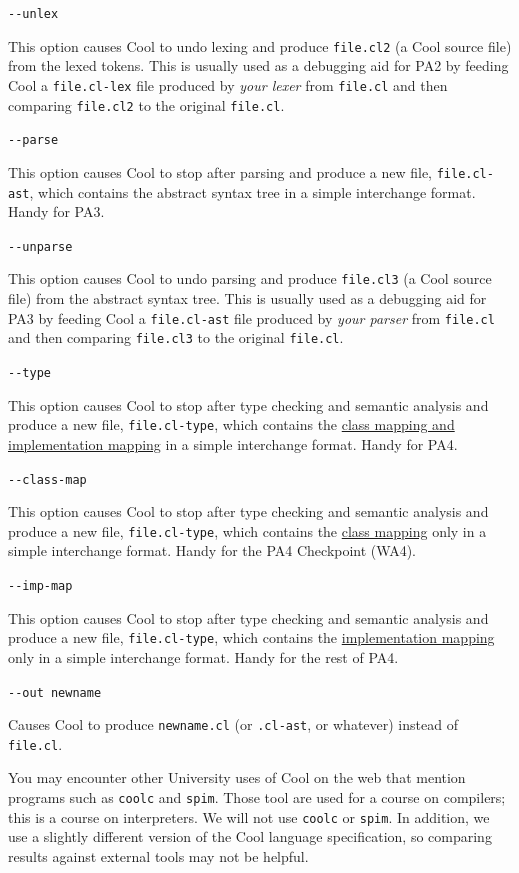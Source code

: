 \documentclass[]{article}
\begin{document}
\texttt{-{}-unlex}

This option causes Cool to undo lexing and produce \texttt{file.cl2} (a
Cool source file) from the lexed tokens. This is usually used as a
debugging aid for PA2 by feeding Cool a \texttt{file.cl-lex} file
produced by \emph{your lexer} from \texttt{file.cl} and then comparing
\texttt{file.cl2} to the original \texttt{file.cl}.

\texttt{-{}-parse}

This option causes Cool to stop after parsing and produce a new file,
\texttt{file.cl-ast}, which contains the abstract syntax tree in a
simple interchange format. Handy for PA3.

\texttt{-{}-unparse}

This option causes Cool to undo parsing and produce \texttt{file.cl3} (a
Cool source file) from the abstract syntax tree. This is usually used as
a debugging aid for PA3 by feeding Cool a \texttt{file.cl-ast} file
produced by \emph{your parser} from \texttt{file.cl} and then comparing
\texttt{file.cl3} to the original \texttt{file.cl}.

\texttt{-{}-type}

This option causes Cool to stop after type checking and semantic
analysis and produce a new file, \texttt{file.cl-type}, which contains
the \href{node47.html}{class mapping and implementation mapping} in a
simple interchange format. Handy for PA4.

\texttt{-{}-class-map}

This option causes Cool to stop after type checking and semantic
analysis and produce a new file, \texttt{file.cl-type}, which contains
the \href{node47.html}{class mapping} only in a simple interchange
format. Handy for the PA4 Checkpoint (WA4).

\texttt{-{}-imp-map}

This option causes Cool to stop after type checking and semantic
analysis and produce a new file, \texttt{file.cl-type}, which contains
the \href{node47.html}{implementation mapping} only in a simple
interchange format. Handy for the rest of PA4.

\texttt{-{}-out newname}

Causes Cool to produce \texttt{newname.cl} (or \texttt{.cl-ast}, or
whatever) instead of \texttt{file.cl}.

You may encounter other University uses of Cool on the web that mention
programs such as \texttt{coolc} and \texttt{spim}. Those tool are used
for a course on compilers; this is a course on interpreters. We will not
use \texttt{coolc} or \texttt{spim}. In addition, we use a slightly
different version of the Cool language specification, so comparing
results against external tools may not be helpful.
\end{document}
